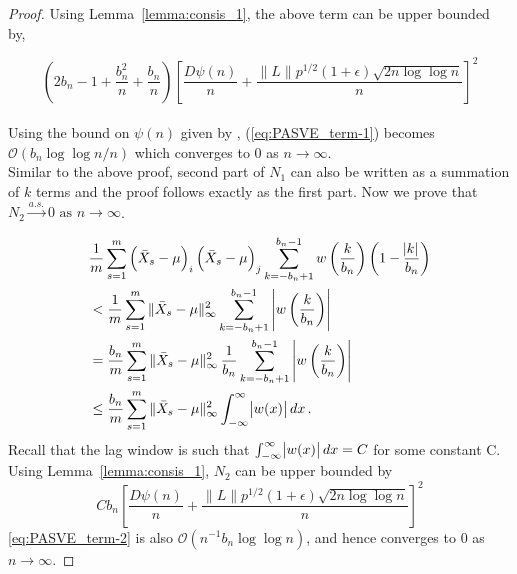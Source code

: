 \documentclass[11pt]{article}
\theoremstyle{remark}
\begin{document}
\begin{proof}
Using Lemma~\ref{lemma:consis_1}, the above term can be upper bounded by,

\begin{equation} \label{eq:PASVE_term-1}
  \left(2b_n - 1 + \dfrac{b_n^2}{n} + \dfrac{b_n}{n}\right)\left[ \dfrac{D \psi(n)}{n} + \dfrac{\|L\| p^{1/2}(1+\epsilon)\sqrt{2n \log\log n}}{n}  \right]^2  
\end{equation}
\\
Using the bound on $\psi(n)$ given by \cite{stra:1964}, (\ref{eq:PASVE_term-1}) becomes $\mathcal{O}\left(b_n \log \log n/n\right)$ which converges to 0 as $n \to \infty$.
\\
Similar to the above proof, second part of $N_1$ can also be written as a summation of $k$ terms and the proof follows exactly as the first part. Now we prove that $N_2 \xrightarrow{a.s.} 0 \textrm{ as } n \to \infty$.

\begin{align*}
    &\dfrac{1}{m} \sum_{s=1}^{m} \left(\bar{X}_s - \mu \right)_i \left(\bar{X}_s - \mu \right)_j\sum_{k=-b_n+1}^{b_n-1}w\left(\dfrac{k}{b_n}\right)\left(1 - \dfrac{\abs{k}}{b_n}\right)\\
    & < \dfrac{1}{m}\sum_{s=1}^{m} \|\bar{X}_s - \mu\|_{\infty}^2 \sum_{k=-b_n+1}^{b_n-1}\left|w\left(\dfrac{k}{b_n}\right)\right|\\
    & = \dfrac{b_n}{m}\sum_{s=1}^{m} \|\bar{X}_s - \mu\|_{\infty}^2\, \dfrac{1}{b_n} \sum_{k=-b_n+1}^{b_n-1}\left|w\left(\dfrac{k}{b_n}\right)\right|\\
    & \leq \dfrac{b_n}{m}\sum_{s=1}^{m} \|\bar{X}_s - \mu\|_{\infty}^2 \int_{-\infty}^{\infty} \abs{w(x)}dx\,.
\end{align*}
Recall that the lag window is such that $\int_{-\infty}^{\infty} \abs{w(x)}dx = C$ for some constant C. Using Lemma~\ref{lemma:consis_1}, $N_2$ can be upper bounded by
%
\begin{equation} \label{eq:PASVE_term-2}
    Cb_n\left[ \dfrac{D \psi(n)}{n} + \dfrac{\|L\| p^{1/2}(1+\epsilon)\sqrt{2n \log\log n}}{n}  \right]^2 
\end{equation}
%
\eqref{eq:PASVE_term-2} is also $\mathcal{O}\left(n^{-1}{b_n \log \log n}\right)$, and hence converges to 0 as $n \to \infty$.
\end{proof}
\end{document}
